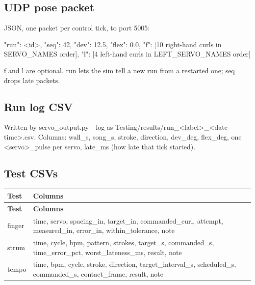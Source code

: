 \documentclass[11pt,letterpaper]{article}
\newcommand{\code}[1]{\textcolor{codeblue}{\ttfamily\smaller\relax #1}}
\begin{document}
\subsection{UDP pose packet}
JSON, one packet per control tick, to port 5005:

\begin{codeblock}
{"run": <id>, "seq": 42, "dev": 12.5, "flex": 0.0,
 "f": [10 right-hand curls in SERVO_NAMES order],
 "l": [4 left-hand curls in LEFT_SERVO_NAMES order]}
\end{codeblock}
\code{f} and \code{l} are optional. \code{run} lets the sim tell a new run from a restarted one; \code{seq} drops late packets.


\subsection{Run log CSV}
Written by \code{servo\_\allowbreak{}output.py -{}-{}log} as \code{Testing/\allowbreak{}results/\allowbreak{}run\_\allowbreak{}<label>\_\allowbreak{}<date-{}\allowbreak{}time>.csv}. Columns: \code{wall\_\allowbreak{}s}, \code{song\_\allowbreak{}s}, \code{stroke}, \code{direction}, \code{dev\_\allowbreak{}deg}, \code{flex\_\allowbreak{}deg}, one \code{<servo>\_\allowbreak{}pulse} per servo, \code{late\_\allowbreak{}ms} (how late that tick started).


\subsection{Test CSVs}
{\small
\begin{longtable}{|>{\raggedright\arraybackslash}p{}|>{\raggedright\arraybackslash}p{}|}
\hline
\rowcolor{tblhead}\textbf{Test} & \textbf{Columns} \\ \hline
\endfirsthead
\hline
\rowcolor{tblhead}\textbf{Test} & \textbf{Columns} \\ \hline
\endhead
finger & \code{time}, \code{servo}, \code{spacing\_\allowbreak{}in}, \code{target\_\allowbreak{}in}, \code{commanded\_\allowbreak{}curl}, \code{attempt}, \code{measured\_\allowbreak{}in}, \code{error\_\allowbreak{}in}, \code{within\_\allowbreak{}tolerance}, \code{note} \\ \hline
strum & \code{time}, \code{cycle}, \code{bpm}, \code{pattern}, \code{strokes}, \code{target\_\allowbreak{}s}, \code{commanded\_\allowbreak{}s}, \code{time\_\allowbreak{}error\_\allowbreak{}pct}, \code{worst\_\allowbreak{}lateness\_\allowbreak{}ms}, \code{result}, \code{note} \\ \hline
tempo & \code{time}, \code{bpm}, \code{cycle}, \code{stroke}, \code{direction}, \code{target\_\allowbreak{}interval\_\allowbreak{}s}, \code{scheduled\_\allowbreak{}s}, \code{commanded\_\allowbreak{}s}, \code{contact\_\allowbreak{}frame}, \code{result}, \code{note} \\ \hline
\end{longtable}}
\end{document}
